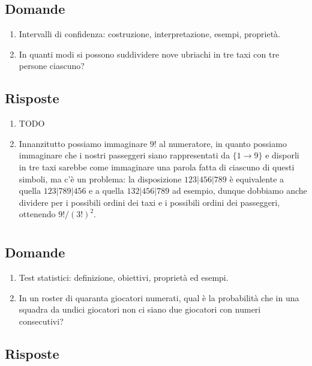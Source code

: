 \documentclass{article}
\begin{document}
\subsection*{Domande}

\begin{enumerate}
    \item Intervalli di confidenza: costruzione, interpretazione, esempi, proprietà.
    \item In quanti modi si possono suddividere nove ubriachi in tre taxi con tre persone ciascuno?
\end{enumerate}

\subsection*{Risposte}

\begin{enumerate}
    \item TODO
    \item Innanzitutto possiamo immaginare $9!$ al numeratore, in quanto possiamo immaginare che i nostri passeggeri siano rappresentati da $\{1\to 9\}$ e disporli in tre taxi sarebbe come immaginare una parola fatta di ciascuno di questi simboli, ma c'è un problema: la disposizione $123|456|789$ è equivalente a quella $123|789|456$ e a quella $132|456|789$ ad esempio, dunque dobbiamo anche dividere per i possibili ordini dei taxi e i possibili ordini dei passeggeri, ottenendo $9!/(3!)^2$.
\end{enumerate}

\section{}%

\subsection*{Domande}

\begin{enumerate}
    \item Test statistici: definizione, obiettivi, proprietà ed esempi.
    \item In un roster di quaranta giocatori numerati, qual è la probabilità che in una squadra da undici giocatori non ci siano due giocatori con numeri consecutivi?
\end{enumerate}

\subsection*{Risposte}
\end{document}
